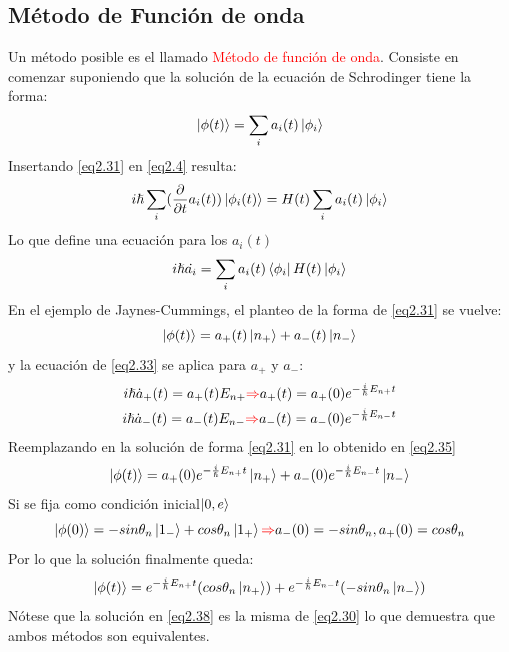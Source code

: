 \documentclass{book}
\begin{document}
\subsection{Método de Función de onda} Un método posible es el llamado \textcolor{red}{Método de función de onda}. Consiste en comenzar suponiendo que la solución de la ecuación de Schrodinger tiene la forma:
    \begin{equation}\label{eq2.31}\ket{\phi(t)}=\sum_i a_i(t)\ket{\phi_i}\end{equation}
    Insertando \ref{eq2.31} en \ref{eq2.4} resulta:
\begin{equation}\label{eq2.32}i\hslash\sum_i(\frac{\partial}{\partial t}a_i(t))\ket{\phi_i(t)}=H(t)\sum_i a_i(t)\ket{\phi_i}\end{equation}
Lo que define una ecuación para los $a_i(t)$
\begin{equation}\label{eq2.33}i\hslash\dot{a_i}=\sum_i a_i(t) \bra{\phi_i}H(t)\ket{\phi_i}\end{equation}
En el ejemplo de Jaynes-Cummings, el planteo de la forma de \ref{eq2.31} se vuelve:
\begin{equation}\label{eq2.34}\ket{\phi(t)}=a_+(t)\ket{n_+}+a_-(t)\ket{n_-}\end{equation}
y la ecuación de \ref{eq2.33} se aplica para $a_+$ y $a_-$:
\begin{equation}\label{eq2.35} \begin{aligned}i\hslash \dot{a}_+(t)=a_+(t)E_{n+}\textcolor{red}{\Rightarrow}a_+(t)=a_+(0)e^{-\frac{i}{\hslash}E_{n+}t}\\i\hslash \dot{a}_-(t)=a_-(t)E_{n-}\textcolor{red}{\Rightarrow}a_-(t)=a_-(0)e^{-\frac{i}{\hslash}E_{n-}t}\end{aligned}\end{equation}
Reemplazando en la solución de forma \ref{eq2.31} en lo obtenido en \ref{eq2.35}
\begin{equation}\label{eq2.36}\ket{\phi(t)}=a_+(0)e^{-\frac{i}{\hslash}E_{n+}t}\ket{n_+}+a_-(0)e^{-\frac{i}{\hslash}E_{n-}t}\ket{n_-}\end{equation}
Si se fija como condición inicial$\ket{0,e}$
\begin{equation}\label{eq2.37}\ket{\phi(0)}=-sin\theta_n\ket{1_-}+cos\theta_n\ket{1_+}\textcolor{red}{\Rightarrow} a_-(0)=-sin\theta_n,a_+(0)=cos\theta_n\end{equation}
Por lo que la solución finalmente queda:
\begin{equation}\label{eq2.38}
\ket{\phi(t)}=e^{-\frac{i}{\hslash}E_{n+}t}(cos\theta_n\ket{n_+})+e^{-\frac{i}{\hslash}E_{n-}t}(-sin\theta_n\ket{n_-})\end{equation}
Nótese que la solución en \ref{eq2.38} es la misma de \ref{eq2.30} lo que demuestra que ambos métodos son equivalentes.
\end{document}

